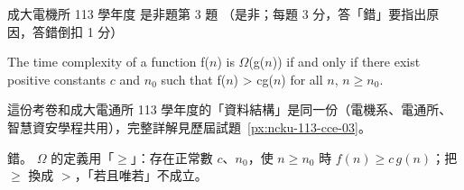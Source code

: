 \begin{pastexam}[label={px:ncku-113-ee-03}]{成大電機所 113 學年度 是非題第 3 題}
（是非；每題 3 分，答「錯」要指出原因，答錯倒扣 1 分）

The time complexity of a function f($n$) is $\Omega$(g($n$)) if and only if there exist
positive constants $c$ and $n_0$ such that f($n$) > cg($n$) for all $n$, $n\ge n_0$.
\end{pastexam}

\begin{pastsoln}
這份考卷和成大電通所 113 學年度的「資料結構」是同一份（電機系、電通所、智慧資安學程共用），完整詳解見歷屆試題~\ref{px:ncku-113-cce-03}。

錯。 $\Omega$ 的定義用「$\ge$」：存在正常數 $c$、$n_0$，使 $n \ge n_0$ 時 $f(n) \ge c\,g(n)$；把 $\ge$ 換成 $>$，「若且唯若」不成立。
\end{pastsoln}

